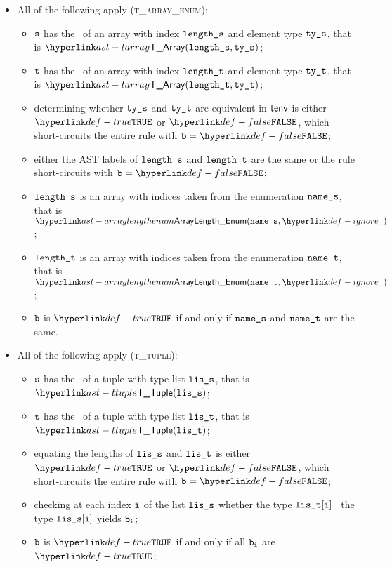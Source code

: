\begin{itemize}
  \item All of the following apply (\textsc{t\_array\_enum}):
  \begin{itemize}
  \item $\texttt{s}$ has the \underlyingtype\ of an array with index $\texttt{length\_s}$ and element type $\texttt{ty\_s}$, that is $\TArray(\vlengths, \vtys)$;
  \item $\texttt{t}$ has the \underlyingtype\ of an array with index $\texttt{length\_t}$ and element type $\texttt{ty\_t}$, that is $\TArray(\vlengtht, \vtyt)$;
  \item determining whether $\texttt{ty\_s}$ and $\texttt{ty\_t}$ are equivalent in $\textsf{tenv}$ is either $\True$
  or $\False$, which short-circuits the entire rule with $\vb=\False$;
  \item either the AST labels of $\texttt{length\_s}$ and $\texttt{length\_t}$ are the same or the rule short-circuits with $\vb=\False$;
  \item $\texttt{length\_s}$ is an array with indices taken from the enumeration $\texttt{name\_s}$, that is $\ArrayLengthEnum(\vnames, \Ignore)$;
  \item $\texttt{length\_t}$ is an array with indices taken from the enumeration $\texttt{name\_t}$, that is $\ArrayLengthEnum(\vnamet, \Ignore)$;
  \item $\texttt{b}$ is $\True$ if and only if $\texttt{name\_s}$ and $\texttt{name\_t}$ are the same.
  \end{itemize}

\item All of the following apply (\textsc{t\_tuple}):
  \begin{itemize}
  \item $\texttt{s}$ has the \underlyingtype\ of a tuple with type list $\texttt{lis\_s}$, that is $\TTuple(\vlis)$;
  \item $\texttt{t}$ has the \underlyingtype\ of a tuple with type list $\texttt{lis\_t}$, that is $\TTuple(\vlit)$;
  \item equating the lengths of $\texttt{lis\_s}$ and $\texttt{lis\_t}$ is either $\True$ or $\False$, which short-circuits
  the entire rule with $\vb=\False$;
  \item checking at each index $\texttt{i}$ of the list $\texttt{lis\_s}$ whether the type $\texttt{lis\_t}[\texttt{i}]$ \typesatisfies\ the type $\texttt{lis\_s}[\texttt{i}]$
  yields $\texttt{b}_{\texttt{i}}$\ProseOrTypeError;
  \item $\texttt{b}$ is $\True$ if and only if all $\texttt{b}_{\texttt{i}}$ are $\True$;
  \end{itemize}


\end{itemize}
